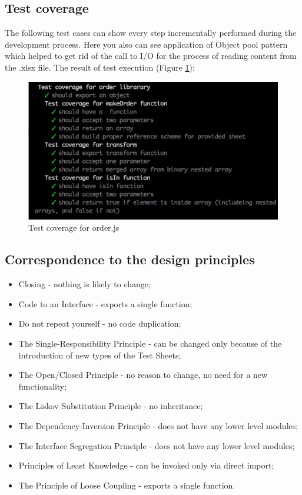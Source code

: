 \subsection{Test coverage}

The following test cases can show every step incrementally performed during the development process. Here you also can see application of Object pool pattern which helped to get rid of the call to I/O for the process of reading content from the .xlsx file.
The result of test execution (Figure \ref{fig:testOrder}): 
\begin{figure}[H]
	\centering
	\includegraphics[width=\linewidth]{grafiken/testOrder.png}
	\caption{Test coverage for order.js}
	\label{fig:testOrder}
\end{figure}

\subsection{Correspondence to  the design principles}
\begin{itemize}
	\item Closing - nothing is likely to change;
	\item Code to an Interface - exports a single function;
	\item Do not repeat yourself - no code duplication;
	\item The Single-Responsibility Principle - can be changed only because of the introduction of new types of the Test Sheets;
	\item The Open/Closed Principle - no reason to change, no need for a new functionality;
	\item The Liskov Substitution Principle - no inheritance;
	\item The Dependency-Inversion Principle - does not have any lower level modules;
	\item The Interface Segregation Principle - does not have any lower level modules;
	\item Principles of Least Knowledge -  can be invoked only via direct import;
	\item The Principle of Loose Coupling - exports a single function.
\end{itemize}

